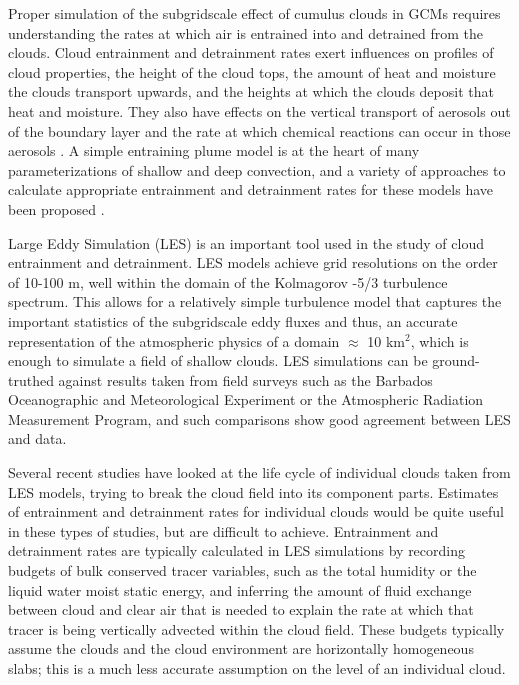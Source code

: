 \documentclass[12pt]{article}
\begin{document}
Proper simulation of the subgridscale effect of cumulus clouds in
GCMs requires understanding the rates at which air is entrained into
and detrained from the clouds. Cloud entrainment and detrainment rates
exert influences on profiles of cloud properties, the height of the
cloud tops, the amount of heat and moisture the clouds transport upwards,
and the heights at which the clouds deposit that heat and moisture.
They also have effects on the vertical transport of aerosols out of
the boundary layer and the rate at which chemical reactions can occur
in those aerosols \citep{Barahona2007,Anldrejczuk2008}. 
A simple entraining plume model is at the heart of many parameterizations
of shallow and deep convection, and a variety of approaches
to calculate appropriate entrainment and detrainment rates
for these models have been proposed
\citep{Lock2000,Bretherton2009,Siebesma2007}.



Large Eddy Simulation (LES) is an important tool used in the study
of cloud entrainment and detrainment. LES models achieve grid resolutions
on the order of 10-100 m, well within the domain of the Kolmagorov -5/3
turbulence spectrum. This allows for a relatively simple turbulence
model that captures the important statistics of the subgridscale eddy
fluxes and thus, an accurate representation of the atmospheric physics
of a domain $\approx$ 10 km$^{2}$, which is enough to simulate a field of shallow clouds. 
LES simulations can be ground-truthed against results taken from field surveys 
such as the Barbados Oceanographic and Meteorological
Experiment \citep[BOMEX;][]{Holland1973} or the Atmospheric Radiation 
Measurement \citep[ARM;][]{Brown2002} Program, and such comparisons 
show good agreement between LES and data.

Several recent studies have looked at the life cycle of individual
clouds taken from LES models, trying to break the cloud field into
its component parts. Estimates of entrainment and detrainment rates
for individual clouds would be quite useful in these types of studies,
but are difficult to achieve. Entrainment and detrainment rates are 
typically calculated in LES simulations by recording budgets
of bulk conserved tracer variables, such as the total humidity or
the liquid water moist static energy, and inferring the amount of
fluid exchange between cloud and clear air that is needed to explain
the rate at which that tracer is being vertically advected within
the cloud field. These budgets typically assume the clouds and the
cloud environment are horizontally homogeneous slabs; this is a much
less accurate assumption on the level of an individual cloud.
\end{document}
